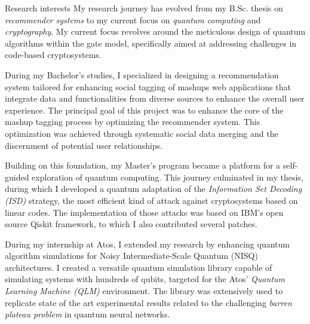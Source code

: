 \documentclass[
	a4paper, %
	10pt, %
]{tresume} %
\begin{document}
\begin{tSection}{Research interests}
  My research journey has evolved from my B.Sc. thesis on \emph{recommender
    systems} to my current focus on \emph{quantum computing} and
  \emph{cryptography}. My current focus revolves around the meticulous design of
  quantum algorithms within the gate model, specifically aimed at addressing
  challenges in code-based cryptosystems.

  During my Bachelor's studies, I specialized in designing a recommendation
  system tailored for enhancing social tagging of mashups \textemdash{} web
  applications that integrate data and functionalities from diverse sources to
  enhance the overall user experience. %
  The principal goal of this project was to enhance the core of the mashup
  tagging process by optimizing the recommender system. This optimization was
  achieved through systematic social data merging and the discernment of
  potential user relationships.


  Building on this foundation, my Master's program became a platform for a
  self-guided exploration of quantum computing. This journey culminated in my
  thesis, during which I developed a quantum adaptation of the \emph{Information
    Set Decoding (ISD)} strategy, the most efficient kind of attack against
  cryptosystems based on linear codes. The implementation of those attacks was
  based on IBM's open source Qiskit framework, to which I also contributed
  several patches.

  During my internship at Atos, I extended my research by enhancing quantum
  algorithm simulations for Noisy Intermediate-Scale Quantum (NISQ)
  architectures. I created a versatile quantum simulation library capable of
  simulating systems with hundreds of qubits, targeted for the Atos'
  \emph{Quantum Learning Machine (QLM)} environment. The library was extensively
  used to replicate state of the art experimental results related to the
  challenging \emph{barren plateau problem} in quantum neural networks.


\end{tSection}
\end{document}
